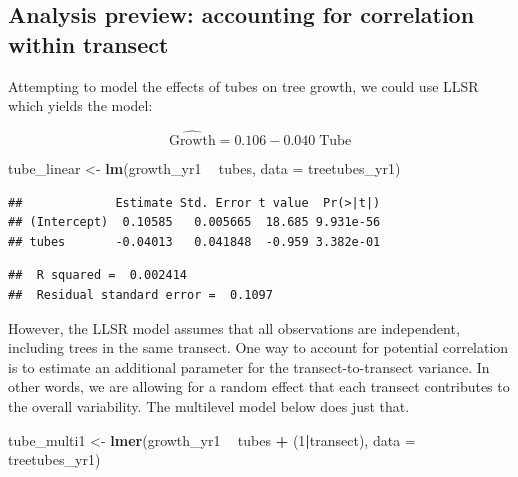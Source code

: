 \documentclass[
]{krantz}
\newenvironment{Shaded}{\begin{snugshade}}{\end{snugshade}}
\newcommand{\DataTypeTok}[1]{\textcolor[rgb]{0.27,0.27,0.27}{#1}}
\newcommand{\DecValTok}[1]{\textcolor[rgb]{0.06,0.06,0.06}{#1}}
\newcommand{\KeywordTok}[1]{\textcolor[rgb]{0.27,0.27,0.27}{\textbf{#1}}}
\newcommand{\NormalTok}[1]{#1}
\newcommand{\OperatorTok}[1]{\textcolor[rgb]{0.43,0.43,0.43}{\textbf{#1}}}
\newcommand{\StringTok}[1]{\textcolor[rgb]{0.5,0.5,0.5}{#1}}
\begin{document}
\hypertarget{analysis-preview-accounting-for-correlation-within-transect}{%
\subsection{Analysis preview: accounting for correlation within transect}\label{analysis-preview-accounting-for-correlation-within-transect}}

Attempting to model the effects of tubes on tree growth, we could use LLSR which yields the model:

\begin{equation*}
  \hat{\textrm{Growth}} = 0.106 - 0.040\; \textrm{Tube}
\end{equation*}

\begin{Shaded}
\begin{Highlighting}[]
\NormalTok{tube_linear <-}\StringTok{ }\KeywordTok{lm}\NormalTok{(growth_yr1 }\OperatorTok{~}\StringTok{ }\NormalTok{tubes, }\DataTypeTok{data =}\NormalTok{ treetubes_yr1)}
\end{Highlighting}
\end{Shaded}

\begin{verbatim}
##             Estimate Std. Error t value  Pr(>|t|)
## (Intercept)  0.10585   0.005665  18.685 9.931e-56
## tubes       -0.04013   0.041848  -0.959 3.382e-01
\end{verbatim}

\begin{verbatim}
##  R squared =  0.002414 
##  Residual standard error =  0.1097
\end{verbatim}

However, the LLSR model assumes that all observations are independent, including trees in the same transect. One way to account for potential correlation is to estimate an additional parameter for the transect-to-transect variance. In other words, we are allowing for a random effect that each transect contributes to the overall variability. The multilevel model below does just that.

\begin{Shaded}
\begin{Highlighting}[]
\NormalTok{tube_multi1 <-}\StringTok{ }\KeywordTok{lmer}\NormalTok{(growth_yr1 }\OperatorTok{~}\StringTok{ }\NormalTok{tubes }\OperatorTok{+}\StringTok{ }\NormalTok{(}\DecValTok{1}\OperatorTok{|}\NormalTok{transect), }
                    \DataTypeTok{data =}\NormalTok{ treetubes_yr1)}
\end{Highlighting}
\end{Shaded}
\end{document}
